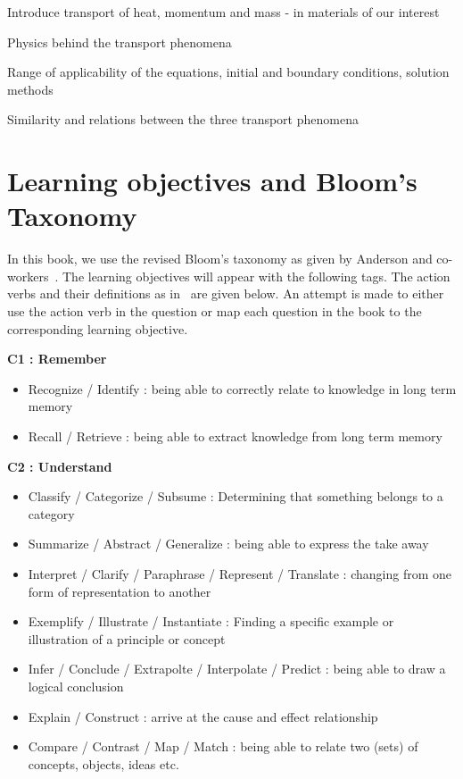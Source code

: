 \begin{list}{}{}
\item Introduce transport of heat, momentum and mass - in materials of our interest
\item Physics behind the transport phenomena
\item Range of applicability of the equations, initial and boundary conditions, solution methods
\item Similarity and relations between the three transport phenomena
\end{list}

\section{Learning objectives and Bloom's Taxonomy}

In this book, we use the revised Bloom's taxonomy as given by Anderson and co-workers~\cite{anderson}. The learning objectives will appear with the following tags. The action verbs and their definitions as in~\cite{anderson} are given below. An attempt is made to either use the action verb in the question or map each question in the book to the corresponding learning objective.

{\bf C1 : Remember} 
\begin{itemize}
\item Recognize / Identify : being able to correctly relate to knowledge in long term memory
\item Recall / Retrieve : being able to extract knowledge from long term memory
\end{itemize}

{\bf C2 : Understand} 
\begin{itemize}
\item Classify / Categorize / Subsume : Determining that something belongs to a category
\item Summarize / Abstract / Generalize : being able to express the take away
\item Interpret / Clarify / Paraphrase / Represent / Translate : changing from one form of representation to another
\item Exemplify / Illustrate / Instantiate : Finding a specific example or illustration of a principle or concept
\item Infer / Conclude / Extrapolte / Interpolate / Predict : being able to draw a logical conclusion
\item Explain / Construct : arrive at the cause and effect relationship
\item Compare / Contrast / Map / Match : being able to relate two (sets) of concepts, objects, ideas etc.
\end{itemize}

